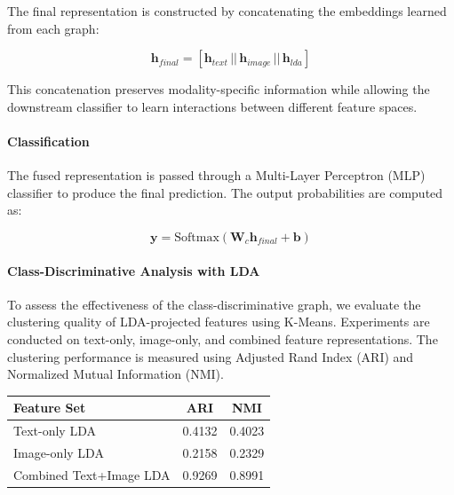 \documentclass[a4paper]{cas-sc}
\begin{document}
The final representation is constructed by concatenating the embeddings learned from each graph:

\begin{equation}
\mathbf{h}_{final} = [\mathbf{h}_{text} \, || \, \mathbf{h}_{image} \, || \, \mathbf{h}_{lda}]
\end{equation}

This concatenation preserves modality-specific information while allowing the downstream classifier to learn interactions between different feature spaces.

\paragraph{Classification}

The fused representation is passed through a Multi-Layer Perceptron (MLP) classifier to produce the final prediction. The output probabilities are computed as:

\begin{equation}
\mathbf{y} = \text{Softmax}(\mathbf{W}_c \mathbf{h}_{final} + \mathbf{b})
\end{equation}

\paragraph{Class-Discriminative Analysis with LDA}

To assess the effectiveness of the class-discriminative graph, we evaluate the clustering quality of LDA-projected features using K-Means. Experiments are conducted on text-only, image-only, and combined feature representations. The clustering performance is measured using Adjusted Rand Index (ARI) and Normalized Mutual Information (NMI).

\FloatBarrier
\begin{center}
\begin{minipage}{\linewidth}
\centering
{}
\label{tab:lda_clustering}
\begin{tabular}{lcc}
\hline
\textbf{Feature Set} & \textbf{ARI} & \textbf{NMI} \\
\hline
Text-only LDA & 0.4132 & 0.4023 \\
Image-only LDA & 0.2158 & 0.2329 \\
Combined Text+Image LDA & 0.9269 & 0.8991 \\
\hline
\end{tabular}
\end{minipage}
\end{center}
\end{document}
